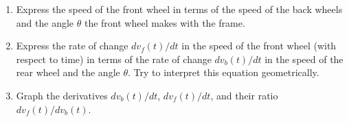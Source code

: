 \documentclass{ximera}
\begin{document}
\begin{exploration}
\begin{enumerate}
\item  Express the speed of the front wheel in terms of the speed of the back wheels and the angle $\theta$ the front wheel makes with the frame.

\item Express the rate of change $dv_f(t)/dt$ in the speed of the front wheel (with respect to time) in terms of the rate of change $dv_b(t)/dt$ in the speed of the rear wheel and the angle $\theta$. Try to interpret this equation geometrically.

\item Graph the derivatives  $dv_b(t)/dt$, $dv_f(t)/dt$, and their ratio $dv_f(t) / dv_b(t)$.



\end{enumerate}
\end{exploration}
\end{document}
